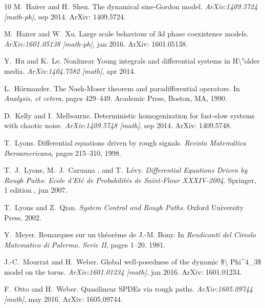 \documentclass[11pt,reqno]{amsart}
\newcommand{\tmtextit}[1]{{\itshape{#1}}}
\begin{document}
\begin{thebibliography}{10}
  M.~Hairer  and  H.~Shen.{\newblock} The
  dynamical sine-Gordon model.{\newblock} \tmtextit{ArXiv:1409.5724
  [math-ph]}, sep 2014.{\newblock} ArXiv: 1409.5724.{\newblock}
  
  M.~Hairer  and  W.~Xu.{\newblock} Large scale
  behaviour of 3d phase coexistence models.{\newblock}
  \tmtextit{ArXiv:1601.05138 [math-ph]}, jan 2016.{\newblock} ArXiv:
  1601.05138.{\newblock}
  
  Y.~Hu  and  K.~Le.{\newblock} Nonlinear Young
  integrals and differential systems in H\textbackslash "older
  media.{\newblock} \tmtextit{ArXiv:1404.7582 [math]}, apr 2014.{\newblock}
  
  L.~H{\"o}rmander.{\newblock} The
  Nash-Moser theorem and paradifferential operators.{\newblock} In
  \tmtextit{Analysis, et cetera},  pages  429--449. Academic Press, Boston,
  MA, 1990.{\newblock}
  
  D.~Kelly  and 
  I.~Melbourne.{\newblock} Deterministic homogenization for fast-slow systems
  with chaotic noise.{\newblock} \tmtextit{ArXiv:1409.5748 [math]}, sep
  2014.{\newblock} ArXiv: 1409.5748.{\newblock}
  
  T.~Lyons.{\newblock} Differential
  equations driven by rough signals.{\newblock} \tmtextit{Revista
  Matem{\'a}tica Iberoamericana},  pages  215--310, 1998.{\newblock}
  
  T.~J.~Lyons, M.~J.~Caruana , and 
  T.~L{\'e}vy.{\newblock} \tmtextit{Differential Equations Driven by Rough
  Paths: Ecole d'Et{\'e} de Probabilit{\'e}s de Saint-Flour
  XXXIV-2004}.{\newblock} Springer, 1  edition , jun 2007.{\newblock}
  
  T.~Lyons  and  Z.~Qian.{\newblock}
  \tmtextit{System Control and Rough Paths}.{\newblock} Oxford University
  Press, 2002.{\newblock}
  
  Y.~Meyer.{\newblock} Remarques sur un
  th{\'e}or{\`e}me de J.-M. Bony.{\newblock} In \tmtextit{Rendiconti del
  Circolo Matematico di Palermo. Serie II},  pages  1--20. 1981.{\newblock}
  
  J.-C.~Mourrat  and  H.~Weber.{\newblock}
  Global well-posedness of the dynamic \$\textbackslash
  Phi{\textasciicircum}4\_3\$ model on the torus.{\newblock}
  \tmtextit{ArXiv:1601.01234 [math]}, jan 2016.{\newblock} ArXiv:
  1601.01234.{\newblock}
  
  F.~Otto  and  H.~Weber.{\newblock}
  Quasilinear SPDEs via rough paths.{\newblock} \tmtextit{ArXiv:1605.09744
  [math]}, may 2016.{\newblock} ArXiv: 1605.09744.{\newblock}
\end{thebibliography}
\end{document}
